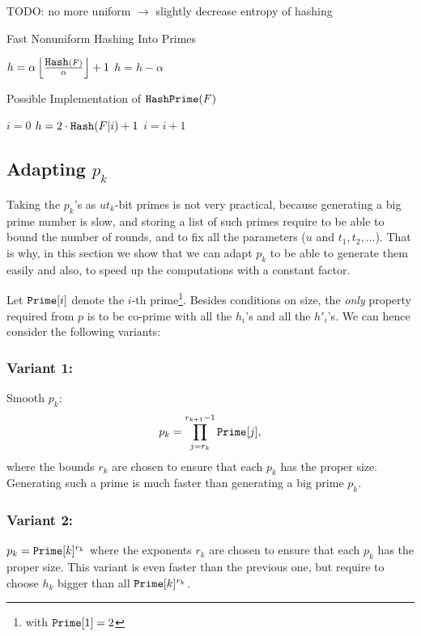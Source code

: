 \documentclass[11pt]{llncs}
\begin{document}
TODO: no more uniform $\longrightarrow$ slightly decrease entropy of hashing

\begin{algorithm}[t]
  \caption{Fast Nonuniform Hashing Into Primes}
  \label{alg:scanprime}
  \begin{algorithmic}[1]
  \State $h =\alpha \left\lfloor\frac{\mbox{{\tt Hash}}(F)}{\alpha}\right\rfloor+1$
\State $h = h-\alpha$
\EndWhile
\State {}
  \end{algorithmic}
\end{algorithm}

\begin{algorithm}[t]
  \caption{Possible Implementation of $\mbox{{\tt HashPrime}}(F)$}
  \label{alg:primes}
  \begin{algorithmic}[1]
  \State $i=0$
\Repeat
\State $h = 2\cdot\mbox{{\tt Hash}}(F|i)+1$
\State $i = i+1$
\State {}
  \end{algorithmic}
\end{algorithm}

\subsection{Adapting $p_k$}
\label{sec:choicep}

Taking the $p_k$'s as $ut_k$-bit primes is not very practical, because generating a big prime number is slow, and storing a list of such primes require to be able to bound the number of rounds, and to fix all the parameters ($u$ and $t_1,t_2,\dots$).
That is why, in this section we show that we can adapt $p_k$ to be able to generate them easily and also, to speed up the computations with a constant factor.

Let $\mbox{{\tt Prime}}[i]$ denote the $i$-th prime\footnote{with $\mbox{{\tt Prime}}[1]=2$}. Besides conditions on size, the {\sl only} property required from $p$ is to be co-prime with all the $h_i$'s and all the $h'_i$'s. We can hence consider the following variants:
\subsubsection{Variant 1:} Smooth $p_k$:
\[ p_k=\prod_{j=r_k}^{r_{k+1}-1} \mbox{{\tt Prime}}[j], \]
where the bounds $r_k$ are chosen to ensure that each $p_k$ has the proper size.
Generating such a prime is much faster than generating a big prime $p_k$.

\subsubsection{Variant 2:} $p_k=\mbox{{\tt Prime}}[k]^{r_k}$ where the exponents $r_k$ are chosen to ensure that each $p_k$ has the proper size.
This variant is even faster than the previous one, but require to choose $h_k$ bigger than all
$\mbox{{\tt Prime}}[k]^{r_k}$. 
\end{document}
